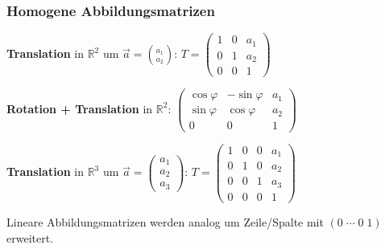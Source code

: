 \subsubsection{Homogene Abbildungsmatrizen}
\textbf{Translation} in $\mathbb{R}^2$ um $\vec{a}=\binom{a_1}{a_2}$: $T = \begin{pmatrix} 1 & 0 & a_1 \\ 0 & 1 & a_2 \\ 0 & 0 & 1 \end{pmatrix}$

\textbf{Rotation + Translation} in $\mathbb{R}^2$:
$\begin{pmatrix} \cos\varphi & -\sin\varphi & a_1 \\ \sin\varphi & \cos\varphi & a_2 \\ 0 & 0 & 1 \end{pmatrix}$

\textbf{Translation} in $\mathbb{R}^3$ um $\vec{a}=\begin{pmatrix}a_1\\a_2\\a_3\end{pmatrix}$: $T = \begin{pmatrix} 1&0&0&a_1 \\ 0&1&0&a_2 \\ 0&0&1&a_3 \\ 0&0&0&1 \end{pmatrix}$

Lineare Abbildungsmatrizen werden analog um Zeile/Spalte mit $(0\;\cdots\;0\;1)$ erweitert.